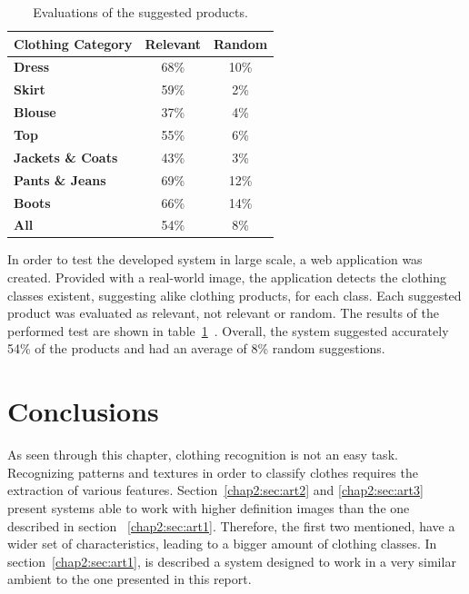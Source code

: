 \documentclass[titlepage,12pt,a4paper,times]{book}
\begin{document}
\begin{table}[!h]
\centering
\begin{tabular}{|l|c|c|}
\hline
\textbf{Clothing Category} & \textbf{Relevant} & \textbf{Random}\\
\hline
\hline
\textbf{Dress} & 68\% & 10\% \\
\hline
\textbf{Skirt} & 59\% & 2\% \\
\hline
\textbf{Blouse} & 37\% & 4\% \\
\hline
\textbf{Top} & 55\% & 6\% \\
\hline
\textbf{Jackets \& Coats} & 43\% & 3\% \\
\hline
\textbf{Pants \& Jeans} & 69\% & 12\% \\
\hline
\textbf{Boots} & 66\% & 14\% \\
\hline
\hline
\textbf{All} & 54\% & 8\% \\
\hline
\end{tabular}
\caption{Evaluations of the suggested products.}
\label{tab:uesp}
\end{table}
\FloatBarrier

In order to test the developed system in large scale, a web application was
created. Provided with a real-world image, the application detects the clothing
classes existent, suggesting alike clothing products, for each class. Each
suggested product was evaluated as relevant, not relevant or random. The
results of the performed test are shown in table~\ref{tab:uesp}~\citep{3}.
Overall, the system suggested accurately 54\% of the products and had an
average of 8\% random suggestions.



\section{Conclusions}
\label{chap2:sec:concs}

As seen through this chapter, clothing recognition is not an easy task.
Recognizing patterns and textures in order to classify clothes requires the
extraction of various features. Section~\ref{chap2:sec:art2} and
\ref{chap2:sec:art3} present systems able to work with higher definition images
than the one described in section ~\ref{chap2:sec:art1}. Therefore, the first
two mentioned, have a wider set of characteristics, leading to a bigger amount
of clothing classes. In section~\ref{chap2:sec:art1}, is described a system
designed to work in a very similar ambient to the one presented in this
report.
\end{document}

